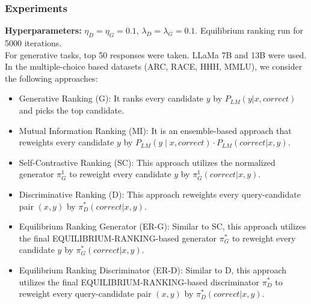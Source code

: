 \documentclass[12pt]{article}
\begin{document}
\subsubsection*{Experiments}
\textbf{Hyperparameters:} $\eta_D=\eta_G=0.1$, $\lambda_D=\lambda_G=0.1$. Equilibrium ranking run for 5000 iterations.\\
For generative tasks, top 50 responses were taken. LLaMa 7B and 13B were used.\\
In the multiple-choice based datasets (ARC, RACE, HHH, MMLU), we consider the
following approaches:
\begin{itemize}
  \item Generative Ranking (G): It ranks every candidate $y$ by $P_{LM}(y | x, correct)$ and picks the top candidate.
  \item Mutual Information Ranking (MI): It is an ensemble-based approach that reweights every candidate $y$ by $P_{LM}(y\mid x, correct) \cdot P_{LM}(correct | x, y)$.
  \item Self-Contrastive Ranking (SC): This approach utilizes the normalized generator $\pi^1_G$ to reweight every candidate $y$ by $\pi^1_G(correct|x,y)$.
  \item Discriminative Ranking (D): This approach reweights every query-candidate pair $(x, y)$ by $\pi_D^*(correct|x,y)$.
  \item Equilibrium Ranking Generator (ER-G): Similar to SC, this approach utilizes the final EQUILIBRIUM-RANKING-based generator $\pi^*_G$ to reweight every candidate $y$ by $\pi^*_G(correct|x,y)$.
  \item Equilibrium Ranking Discriminator (ER-D): Similar to D, this approach utilizes the final EQUILIBRIUM-RANKING-based discriminator $\pi^*_D$ to reweight every query-candidate pair $(x, y)$ by $\pi^*_D(correct|x,y)$.
\end{itemize}
\end{document}
